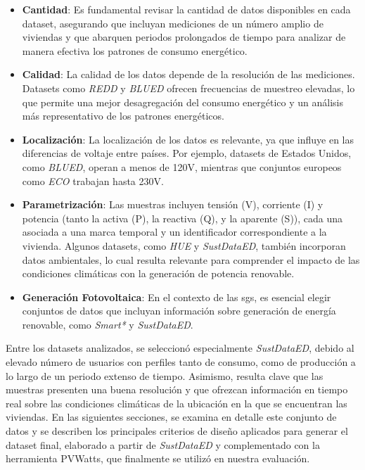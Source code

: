 \begin{itemize}
    \item \textbf{Cantidad}: Es fundamental revisar la cantidad de datos disponibles en cada dataset, asegurando que incluyan mediciones de un número amplio de viviendas y que abarquen periodos prolongados de tiempo para analizar de manera efectiva los patrones de consumo energético.

    \item \textbf{Calidad}: La calidad de los datos depende de la resolución de las mediciones. Datasets como \textit{REDD} y \textit{BLUED} ofrecen frecuencias de muestreo elevadas, lo que permite una mejor desagregación del consumo energético y un análisis más representativo de los patrones energéticos.
    
    \item \textbf{Localización}: La localización de los datos es relevante, ya que influye en las diferencias de voltaje entre países. Por ejemplo, datasets de Estados Unidos, como \textit{BLUED}, operan a menos de 120V, mientras que conjuntos europeos como \textit{ECO} trabajan hasta 230V.
    
    \item \textbf{Parametrización}: Las muestras incluyen tensión (V), corriente (I) y potencia (tanto la activa (P), la reactiva (Q), y la aparente (S)), cada una asociada a una marca temporal y un identificador correspondiente a la vivienda. Algunos datasets, como \textit{HUE} y \textit{SustDataED}, también incorporan datos ambientales, lo cual resulta relevante para comprender el impacto de las condiciones climáticas con la generación de potencia renovable.
    
    \item \textbf{Generación Fotovoltaica}: En el contexto de las \glspl{sg}, es esencial elegir conjuntos de datos que incluyan información sobre generación de energía renovable, como \textit{Smart*} y \textit{SustDataED}.
\end{itemize}

Entre los datasets analizados, se seleccionó especialmente \textit{SustDataED}, debido al elevado número de usuarios con perfiles tanto de consumo, como de producción a lo largo de un periodo extenso de tiempo. Asimismo, resulta clave que las muestras presenten una buena resolución y que ofrezcan información en tiempo real sobre las condiciones climáticas de la ubicación en la que se encuentran las viviendas. En las siguientes secciones, se examina en detalle este conjunto de datos y se describen los principales criterios de diseño aplicados para generar el dataset final, elaborado a partir de \textit{SustDataED} y complementado con la herramienta PVWatts, que finalmente se utilizó en nuestra evaluación.

